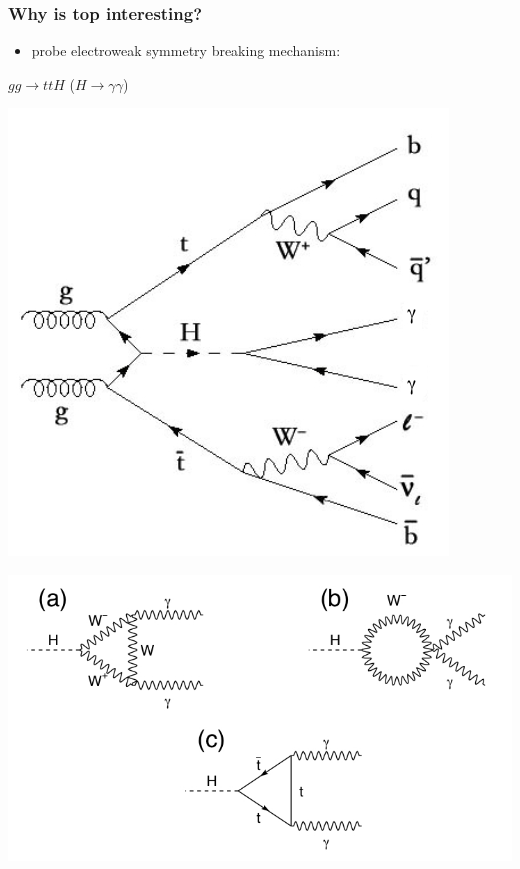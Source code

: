 \documentclass[9pt, xcolor=dvipsnames]{beamer}
\begin{document}
\begin{frame}
 \frametitle{Why is top interesting?}
\begin{itemize}
 \item probe electroweak symmetry breaking mechanism:
\end{itemize}
\begin{block}{}
\begin{center}
 $gg\rightarrow ttH$ ($H\rightarrow\gamma\gamma$)
\end{center}
\end{block}
\begin{minipage}{.5\columnwidth}
\includegraphics[scale=0.3]{tth}
\end{minipage}
\begin{minipage}{.3\columnwidth}
\includegraphics[scale=0.25]{hgg}
\end{minipage}
\end{frame}
\end{document}
